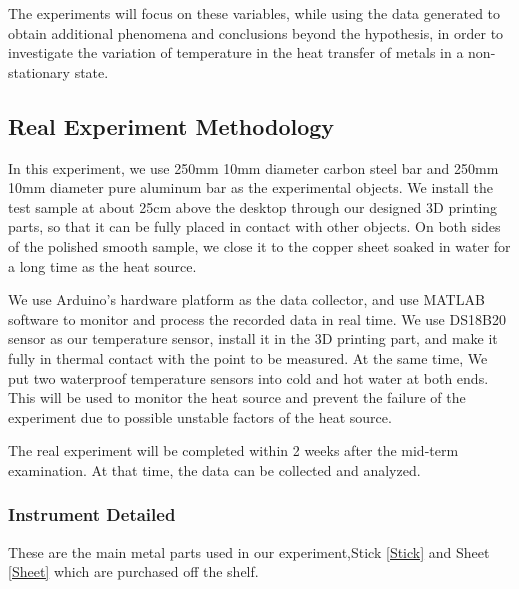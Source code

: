 \documentclass[12pt]{article}
\numberwithin{equation}{section}
\begin{document}
The experiments will focus on these variables, while using the data generated to obtain additional phenomena and conclusions beyond the hypothesis, in order to investigate the variation of temperature in the heat transfer of metals in a non-stationary state.


















\subsection{Real Experiment Methodology}

In this experiment, we use 250mm 10mm diameter carbon steel bar and 250mm 10mm diameter pure aluminum bar as the experimental objects. We install the test sample at about 25cm above the desktop through our designed 3D printing parts, so that it can be fully placed in contact with other objects. On both sides of the polished smooth sample, we close it to the copper sheet soaked in water for a long time as the heat source.


We use Arduino's hardware platform as the data collector, and use MATLAB software to monitor and process the recorded data in real time. We use DS18B20 sensor as our temperature sensor, install it in the 3D printing part, and make it fully in thermal contact with the point to be measured. At the same time, We put two waterproof temperature sensors into cold and hot water at both ends. This will be used to monitor the heat source and prevent the failure of the experiment due to possible unstable factors of the heat source.

The real experiment will be completed within 2 weeks after the mid-term examination. At that time, the data can be collected and analyzed.



\subsubsection{Instrument Detailed}
These are the main metal parts used in our experiment,Stick \ref{Stick} and Sheet \ref{Sheet} which are purchased off the shelf.
\end{document}
